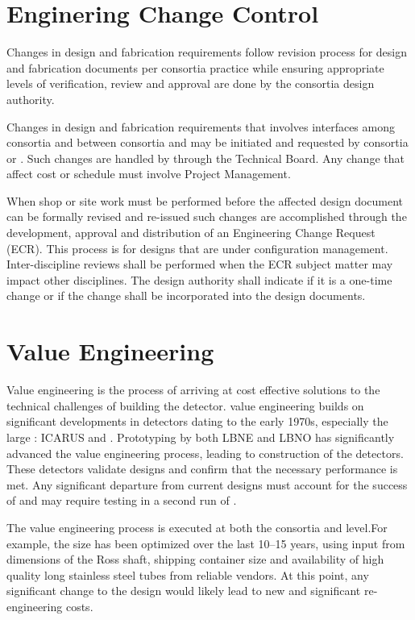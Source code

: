 \section{Enginering Change Control}
\label{sec:fdsp-change}

Changes in design and fabrication requirements follow revision process
for design and fabrication documents per consortia practice while
ensuring appropriate levels of verification, review and approval are
done by the consortia design authority.

Changes in design and fabrication requirements that involves
interfaces among consortia and between consortia and  may be
initiated and requested by consortia or . Such changes are
handled by  through the Technical Board. Any change that
affect cost or schedule must involve Project Management.

When shop or site work must be performed before the affected design
document can be formally revised and re-issued such changes are
accomplished through the development, approval and distribution of an
Engineering Change Request (ECR). This process is for designs that are
under configuration management. Inter-discipline reviews shall be
performed when the ECR subject matter may impact other
disciplines. The design authority shall indicate if it is a one-time
change or if the change shall be incorporated into the design
documents.



\section{Value Engineering}
\label{sec:fdsp-coord-ve}

Value engineering is the process of arriving at cost effective
solutions to the technical challenges of building the 
detector.  value engineering builds on significant
developments in  detectors dating to the early 1970s,
especially the large : ICARUS and
. Prototyping by both LBNE and LBNO has
significantly advanced the value engineering process, leading to
construction of the  detectors. These detectors validate
 designs and confirm that the necessary performance is
met. Any significant departure from current designs must account for
the success of  and may require testing in a second
run of . 

The value engineering process is executed at both the consortia and
 level.For example, the  size has been optimized
over the last 10--15 years, using input from dimensions of the Ross
shaft, shipping container size and availability of high quality long
stainless steel tubes from reliable vendors.  At this point, any
significant change to the  design would likely lead to new
and significant re-engineering costs.

